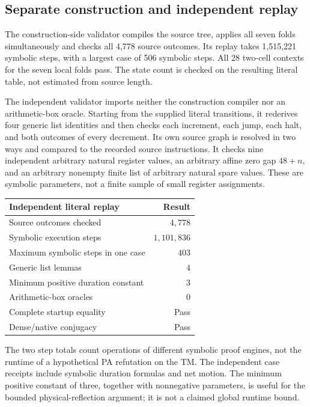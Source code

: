 \documentclass[11pt,a4paper]{article}
\begin{document}
\subsection{Separate construction and independent replay}

The construction-side validator compiles the source tree, applies all
seven folds simultaneously and checks all 4,778 source outcomes.
Its replay takes 1,515,221 symbolic steps, with a largest case of 506
symbolic steps. All 28 two-cell contexts for the seven local folds pass.
The state count is checked on the resulting literal table, not estimated
from source length.

The independent validator imports neither the construction compiler nor
an arithmetic-box oracle. Starting from the supplied literal transitions,
it rederives four generic list identities and then checks each increment,
each jump, each halt, and both outcomes of every decrement. Its own
source graph is resolved in two ways and compared to the recorded source
instructions. It checks nine independent arbitrary natural register
values, an arbitrary affine zero gap $48+n$, and an arbitrary nonempty
finite list of arbitrary natural spare values. These are symbolic
parameters, not a finite sample of small register assignments.

\begin{center}
\begin{tabular}{lr}
\toprule
Independent literal replay & Result\\
\midrule
Source outcomes checked & $4,778$\\
Symbolic execution steps & $1,101,836$\\
Maximum symbolic steps in one case & $403$\\
Generic list lemmas & $4$\\
Minimum positive duration constant & $3$\\
Arithmetic-box oracles & $0$\\
Complete startup equality & Pass\\
Dense/native conjugacy & Pass\\
\bottomrule
\end{tabular}
\end{center}

The two step totals count operations of different symbolic proof engines,
not the runtime of a hypothetical PA refutation on the TM. The independent
case receipts include symbolic duration formulas and net motion. The
minimum positive constant of three, together with nonnegative parameters,
is useful for the bounded physical-reflection argument; it is not a
claimed global runtime bound.
\end{document}
